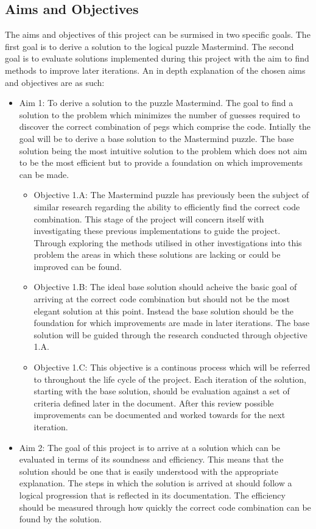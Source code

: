 \documentclass[12pt]{article}  %
\theoremstyle{definition}
\theoremstyle{remark}
\begin{document}
\subsection {Aims and Objectives}
The aims and objectives of this project can be surmised in two specific goals. The first goal is to derive a solution to the logical puzzle Mastermind. The second goal is to evaluate solutions implemented during this project with the aim to find methods to improve later iterations. An in depth explanation of the chosen aims and objectives are as such:
\begin {itemize}
\item{Aim 1: To derive a solution to the puzzle Mastermind. The goal to find a solution to the problem which minimizes the number of guesses required to discover the correct combination of pegs which comprise the code. Intially the goal will be to derive a base solution to the Mastermind puzzle. The base solution being the most intuitive solution to the problem which does not aim to be the most efficient but to provide a foundation on which improvements can be made.}
	\begin {itemize}
	\item{Objective 1.A: The Mastermind puzzle has previously been the subject of similar research regarding the ability to efficiently find the correct code combination. This stage of the project will concern itself with investigating these previous implementations to guide the project. Through exploring the methods utilised in other investigations into this problem the areas in which these solutions are lacking or could be improved can be found.}
	\item{Objective 1.B:  The ideal base solution should acheive the basic goal of arriving at the correct code combination but should not be the most elegant solution at this point. Instead the base solution should be the foundation for which improvements are made in later iterations. The base solution will be guided through the research conducted through objective 1.A.}
	\item{Objective 1.C: This objective is a continous process which will be referred to throughout the life cycle of the project. Each iteration of the solution, starting with the base solution, should be evaluation against a set of criteria defined later in the document. After this review possible improvements can be documented and worked towards for the next iteration.}
	\end {itemize}
\item{Aim 2: The goal of this project is to arrive at a solution which can be evaluated in terms of its soundness and efficiency. This means that the solution should be one that is easily understood with the appropriate explanation. The steps in which the solution is arrived at should follow a logical progression that is reflected in its documentation. The efficiency should be measured through how quickly the correct code combination can be found by the solution.}

\end{itemize}
\end{document}
